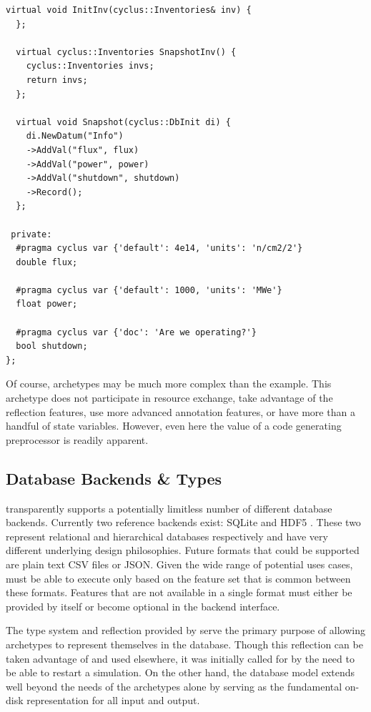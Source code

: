 \begin{lstlisting}[caption={Simple Reactor Archetype After Preprocessing with \cycpp, 
                            line marker directives have been removed for space}, 
                   label=rx-eg-cycpp]
  virtual void InitInv(cyclus::Inventories& inv) {
  };

  virtual cyclus::Inventories SnapshotInv() {
    cyclus::Inventories invs;
    return invs;
  };

  virtual void Snapshot(cyclus::DbInit di) {
    di.NewDatum("Info")
    ->AddVal("flux", flux)
    ->AddVal("power", power)
    ->AddVal("shutdown", shutdown)
    ->Record();
  };

 private:
  #pragma cyclus var {'default': 4e14, 'units': 'n/cm2/2'}
  double flux;

  #pragma cyclus var {'default': 1000, 'units': 'MWe'}
  float power;

  #pragma cyclus var {'doc': 'Are we operating?'}
  bool shutdown;
};
\end{lstlisting}

Of course, archetypes may be much more complex than the  example.
This archetype does not participate in resource exchange, take advantage of 
the reflection features, use more advanced annotation features, or have more than 
a handful of state variables.  However, even here the value of a code generating
preprocessor is readily apparent.

\subsection{Database Backends \& Types}

\Cyclus transparently supports a potentially limitless number of different database 
backends. Currently two reference backends exist: \gls{SQLite} \cite{owens2006definitive} 
and \gls{HDF5} \cite{folk2011overview}. These two represent relational and hierarchical 
databases respectively and have very different underlying design philosophies.
Future formats that could be supported are plain text 
\gls{CSV} files or \gls{JSON}.  Given the wide range of potential uses cases, \cyclus must be able 
to execute only based on the feature set that is common between these formats.
Features that are not available in a single format must either be provided by \cyclus 
itself or become optional in the backend interface.

The type system and reflection provided by \cycpp serve the primary purpose of 
allowing archetypes to represent themselves in the database. Though this 
reflection can be taken advantage of and used elsewhere, it was initially called for 
by the need to be able to restart a simulation. On the other hand, 
the database model extends well beyond the needs of the archetypes alone by 
serving as the fundamental on-disk representation for all \cyclus input and output.

